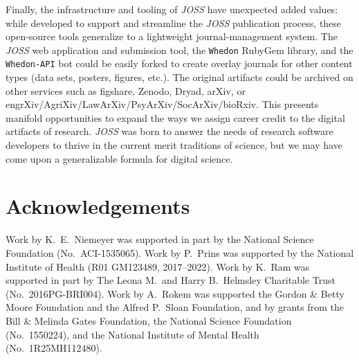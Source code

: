 \documentclass{article}
\newcommand{\add}[1]{{\sloppy\cbcolor{teal}\textcolor{teal}{\cbstart {#1}\cbend}}}  %
\newcommand\joss{\textit{JOSS}}
\begin{document}
Finally, the infrastructure and tooling of \joss{} have unexpected added values: while developed to
support and streamline the \joss{} publication process, these open-source tools generalize to a lightweight journal-management system.
The \joss{} web application and submission tool, the \texttt{Whedon} RubyGem library, and the \texttt{Whedon-API} bot could be easily forked to create overlay journals for other content types (data sets, posters, figures, etc.).
The original artifacts could be archived on other
services such as figshare, Zenodo, Dryad, arXiv, or engrXiv\slash AgriXiv\slash LawArXiv\slash PsyArXiv\slash SocArXiv\slash bioRxiv.
This presents manifold opportunities to expand the ways we assign career credit to the digital artifacts of research.
\joss{} was born to answer the needs of research software developers to thrive in the current merit traditions of science, but we may have come upon a generalizable formula for digital science.

\section*{Acknowledgements}

Work by K.~E.~Niemeyer was supported in part by the National Science Foundation (No.\ ACI-1535065).
Work by P.~Prins was supported by the National Institute of Health (R01 GM123489, 2017--2022).
Work by K.~Ram was supported in part by The Leona M.\ and Harry B.~Helmsley Charitable Trust (No.\ 2016PG-BRI004).
Work by A.~Rokem was supported \add{by} the Gordon \& Betty Moore Foundation and
the Alfred P.~Sloan Foundation, and by grants from the Bill \& Melinda Gates
Foundation, the National Science Foundation (No.\ 1550224), and the National
Institute of Mental Health (No.\ 1R25MH112480).

\printbibliography
\end{document}
